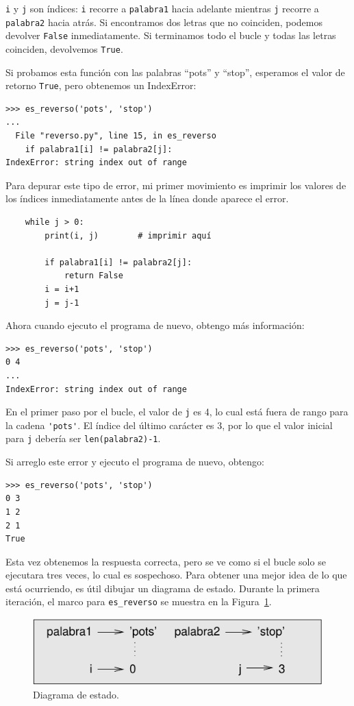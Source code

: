 \documentclass[10pt]{book}
\begin{document}
{\tt i} y {\tt j} son índices: {\tt i} recorre a {\tt palabra1}
hacia adelante mientras {\tt j} recorre a {\tt palabra2} hacia atrás.  Si encontramos
dos letras que no coinciden, podemos devolver {\tt False} inmediatamente.
Si terminamos todo el bucle y todas las letras coinciden,
devolvemos {\tt True}.

Si probamos esta función con las palabras ``pots'' y ``stop'',
esperamos el valor de retorno {\tt True}, pero obtenemos un IndexError:

\begin{verbatim}
>>> es_reverso('pots', 'stop')
...
  File "reverso.py", line 15, in es_reverso
    if palabra1[i] != palabra2[j]:
IndexError: string index out of range
\end{verbatim}
%
Para depurar este tipo de error, mi primer movimiento es
imprimir los valores de los índices inmediatamente antes de la línea
donde aparece el error.

\begin{verbatim}
    while j > 0:
        print(i, j)        # imprimir aquí

        if palabra1[i] != palabra2[j]:
            return False
        i = i+1
        j = j-1
\end{verbatim}
%
Ahora cuando ejecuto el programa de nuevo, obtengo más información:

\begin{verbatim}
>>> es_reverso('pots', 'stop')
0 4
...
IndexError: string index out of range
\end{verbatim}
%
En el primer paso por el bucle, el valor de {\tt j} es 4,
lo cual está fuera de rango para la cadena \verb"'pots'".
El índice del último carácter es 3, por lo que el
valor inicial para {\tt j} debería ser {\tt len(palabra2)-1}.

Si arreglo este error y ejecuto el programa de nuevo, obtengo:

\begin{verbatim}
>>> es_reverso('pots', 'stop')
0 3
1 2
2 1
True
\end{verbatim}
%
Esta vez obtenemos la respuesta correcta, pero se ve como si el bucle solo se ejecutara
tres veces, lo cual es sospechoso.  Para obtener una mejor idea de lo que está
ocurriendo, es útil dibujar un diagrama de estado.  Durante la primera
iteración, el marco para \verb"es_reverso" se muestra en la
Figura~\ref{fig.state4}.   

\begin{figure}
\centerline
{\includegraphics[scale=0.8]{figs/state4.pdf}}
\caption{Diagrama de estado.}
\label{fig.state4}
\end{figure}
\end{document}
